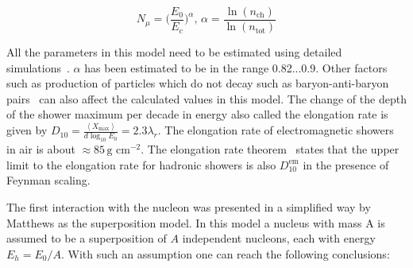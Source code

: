 \begin{equation}
    N_{\mu} = \biggl(\frac{E_0}{E_c}\biggr)^{\alpha} , \, \alpha = \frac{\ln (n_{\text{ch}})}{\ln (n_{\text{tot}})}
\end{equation}

All the parameters in this model need to be estimated using detailed simulations~\cite{PhysRevD.66.033011}. $\alpha$ has been estimated to be in the range 0.82...0.9. Other factors such as production of particles which do not decay such as baryon-anti-baryon pairs~\cite{ Pierog:2006qv} can also affect the calculated values in this model. The change of the depth of the shower maximum per decade in energy also called the elongation rate is given by $D_{10} = \frac{\left\langle X_{\text{max}}\right\rangle }{d\log_{10}E_0} = 2.3\lambda_r$. The elongation rate of electromagnetic showers in air is about $\approx 85\,\text{g cm}^{-2}$. The elongation rate theorem~\cite{Linsley_1977} states that the upper limit to the elongation rate for hadronic showers is also $D_{10}^{\text{em}}$ in the presence of Feynman scaling.

The first interaction with the nucleon was presented in a simplified way by Matthews as the superposition model. In this model a nucleus with mass A is assumed to be a superposition of $A$ independent nucleons, each with energy $E_h = E_0/A$. With such an assumption one can reach the following conclusions:

